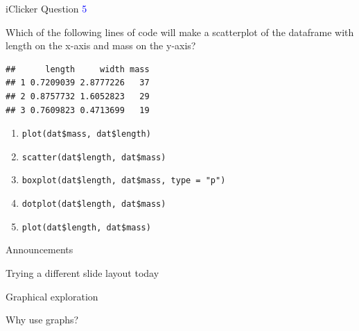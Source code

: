 \documentclass[ignorenonframetext,t]{beamer}
\begin{document}
\begin{frame}[fragile]{iClicker Question \textcolor{blue}{5}}

Which of the following lines of code will make a scatterplot of the
dataframe with length on the x-axis and mass on the y-axis?

\begin{verbatim}
##      length     width mass
## 1 0.7209039 2.8777226   37
## 2 0.8757732 1.6052823   29
## 3 0.7609823 0.4713699   19
\end{verbatim}

\begin{enumerate}[A]
\item \texttt{plot(dat\$mass, dat\$length)}
\item \texttt{scatter(dat\$length, dat\$mass)}
\item \texttt{boxplot(dat\$length, dat\$mass, type = "p")}
\item \texttt{dotplot(dat\$length, dat\$mass)}
\item \texttt{plot(dat\$length, dat\$mass)}
\end{enumerate}

\vfill


\end{frame}

\begin{frame}{Announcements}

Trying a different slide layout today

\end{frame}

\begin{frame}{Graphical exploration}

Why use graphs?


\end{frame}
\end{document}
